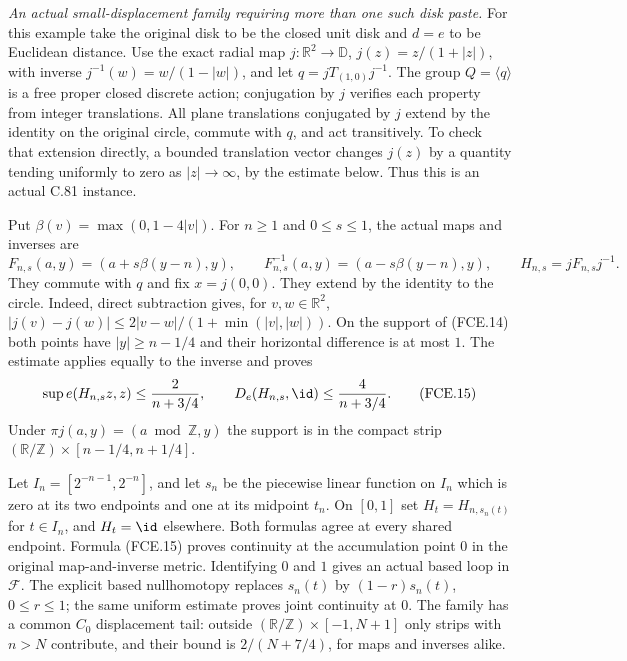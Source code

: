 \emph{An actual small-displacement family requiring more than one such disk paste.}
For this example take the original disk to be the closed
unit disk and $d=e$ to be Euclidean distance. Use the exact
radial map
$j:\mathbb R^2\to\mathbb D$, $j(z)=z/(1+|z|)$, with
inverse $j^{-1}(w)=w/(1-|w|)$, and let
$q=jT_{(1,0)}j^{-1}$. The group $Q=\langle q\rangle$
is a free proper closed discrete action; conjugation by
$j$ verifies each property from integer translations.
All plane translations conjugated by $j$ extend by the
identity on the original circle, commute with $q$, and
act transitively. To check that extension directly, a
bounded translation vector changes $j(z)$ by a quantity
tending uniformly to zero as $|z|\to\infty$, by the
estimate below. Thus this is an actual C.81 instance.

Put $\beta(v)=\max(0,1-4|v|)$. For $n\geq1$ and
$0\leq s\leq1$, the actual maps and inverses are
\[
 F_{n,s}(a,y)=(a+s\beta(y-n),y),\qquad
 F_{n,s}^{-1}(a,y)=(a-s\beta(y-n),y),\qquad
 H_{n,s}=jF_{n,s}j^{-1}.
                                                               \tag{FCE.14}
\]
They commute with $q$ and fix $x=j(0,0)$. They extend by
the identity to the circle. Indeed, direct subtraction
gives, for $v,w\in\mathbb R^2$,
$|j(v)-j(w)|\leq
2|v-w|/(1+\min(|v|,|w|))$.
On the support of (FCE.14) both points have
$|y|\geq n-1/4$ and their horizontal difference is at most $1$.
The estimate applies equally to the inverse and proves
\[
 \sup e(H_{n,s}z,z)\leq\frac{2}{n+3/4},\qquad
 D_e(H_{n,s},\id)\leq\frac{4}{n+3/4}.
                                                               \tag{FCE.15}
\]
Under $\pi j(a,y)=(a\bmod\mathbb Z,y)$ the support is
in the compact strip
$(\mathbb R/\mathbb Z)\times[n-1/4,n+1/4]$.

Let $I_n=[2^{-n-1},2^{-n}]$, and let $s_n$ be the
piecewise linear function on $I_n$ which is zero at its
two endpoints and one at its midpoint $t_n$.
On $[0,1]$ set $H_t=H_{n,s_n(t)}$ for $t\in I_n$,
and $H_t=\id$ elsewhere. Both formulas agree at every
shared endpoint. Formula (FCE.15) proves continuity at
the accumulation point $0$ in the original map-and-inverse
metric. Identifying $0$ and $1$ gives an actual based loop in
$\mathscr F$. The explicit based nullhomotopy replaces
$s_n(t)$ by $(1-r)s_n(t)$, $0\leq r\leq1$; the same
uniform estimate proves joint continuity at $0$.
The family has a common $C_0$ displacement tail: outside
$(\mathbb R/\mathbb Z)\times[-1,N+1]$ only strips with
$n>N$ contribute, and their bound is
$2/(N+7/4)$, for maps and inverses alike.

